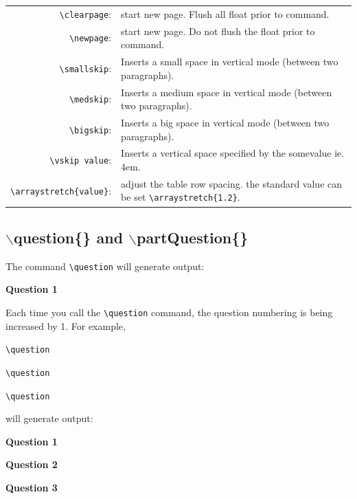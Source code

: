 \documentclass[12pt]{article}
\begin{document}
\begin{table}[H]
	\begin{tabularx}{\linewidth}{r X}		
		\verb|\clearpage|: & start new page. Flush all float prior to command. \\
		
		\verb|\newpage|: & start new page. Do not flush the float prior to command.\\
		
		\verb|\smallskip|: & Inserts a small space in vertical mode (between two paragraphs).\\
		
		\verb|\medskip|: & Inserts a medium space in vertical mode (between two paragraphs).\\
		
		\verb|\bigskip|: & Inserts a big space in vertical mode (between two paragraphs).\\
		
		\verb|\vskip value|: & Inserts a vertical space specified by the somevalue ie. 4em. \\
		\verb|\arraystretch{value}|: & adjust the table row spacing. the standard value can be set \verb|\arraystretch{1.2}|.  
	\end{tabularx}
\end{table}

\subsection{$\backslash$question\{\} and $\backslash$partQuestion\{\}}
The command \verb|\question| will generate output:

\begin{framed}
	\textbf{Question 1\\
		}
\end{framed}


Each time you call the \verb|\question| command, the question numbering is being increased by 1. For example, \bigskip

\verb|\question|

\verb|\question|

\verb|\question|\bigskip

will generate output:

\begin{framed}
	\textbf{
		Question 1\\
	}
	
	\medskip
	\textbf{
		Question 2\\
	}
	
	\medskip
	\textbf{
		Question 3\\
	}
	
\end{framed}
\end{document}
